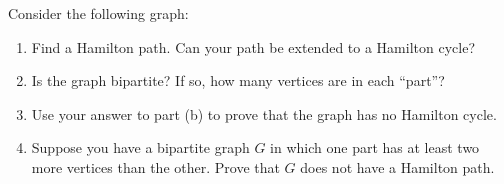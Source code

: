 \documentclass{book}
\begin{document}
\setcounter{cpjt}{18}
\addtocounter{cpjt}{-1}
\begin{activity}\label{activity-13}
\hypertarget{p-195}{}%
Consider the following graph:%
\begin{sidebyside}{1}{0.36}{0.36}{0}
\begin{sbspanel}{0.28}
\end{sbspanel}
\end{sidebyside}
\begin{enumerate}[font=\bfseries,label=(\alph*),ref=\alph*]
\item\label{task-16} \hypertarget{p-196}{}%
Find a Hamilton path.  Can your path be extended to a Hamilton cycle?%
\item\label{task-17} \hypertarget{p-197}{}%
Is the graph bipartite? If so, how many vertices are in each ``part''?%
\item\label{task-18} \hypertarget{p-198}{}%
Use your answer to part (b) to prove that the graph has no Hamilton cycle.%
\item\label{task-19} \hypertarget{p-199}{}%
Suppose you have a bipartite graph \(G\) in which one part has at least two more vertices than the other.  Prove that \(G\) does not have a Hamilton path.%
\end{enumerate}
\end{activity}

\clearpage
\end{document}
